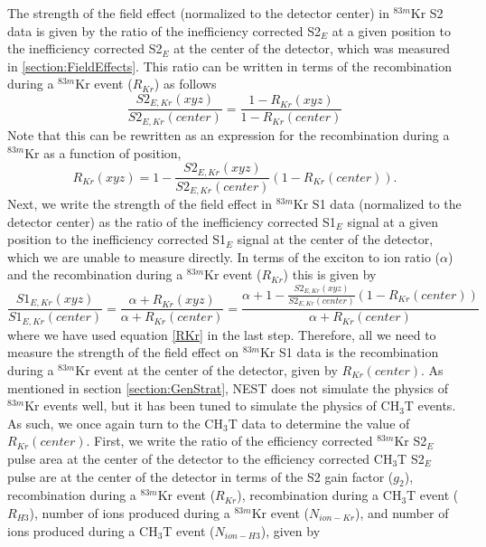 The strength of the field effect (normalized to the detector center) in $^{83m}$Kr S2 data is given by the ratio of the inefficiency corrected S2$_E$ at a given position to the inefficiency corrected S2$_E$ at the center of the detector, which was measured in \ref{section:FieldEffects}.  This ratio can be written in terms of the recombination during a $^{83m}$Kr event ($R_{Kr}$) as follows
\begin{equation}
\frac{S2_{E,Kr}(xyz)}{S2_{E,Kr}(center)} = \frac{1-R_{Kr}(xyz)}{1-R_{Kr}(center)}
\end{equation}
Note that this can be rewritten as an expression for the recombination during a $^{83m}$Kr as a function of position,
\begin{equation} \label{RKr}
R_{Kr}(xyz) = 1- \frac{S2_{E,Kr}(xyz)}{S2_{E,Kr}(center)}(1-R_{Kr}(center)).
\end{equation}
Next, we write the strength of the field effect in $^{83m}$Kr S1 data (normalized to the detector center) as the ratio of the inefficiency corrected S1$_E$ signal at a given position to the inefficiency corrected S1$_E$ signal at the center of the detector, which we are unable to measure directly.  In terms of the exciton to ion ratio ($\alpha$) and the recombination during a $^{83m}$Kr event ($R_{Kr}$) this is given by 
\begin{equation} \label{S1fieldstrength}
\frac{S1_{E,Kr}(xyz)}{S1_{E,Kr}(center)}=\frac{\alpha+R_{Kr}(xyz)}{\alpha+R_{Kr}(center)} = \frac{\alpha + 1 - \frac{S2_{E,Kr}(xyz)}{S2_{E,Kr}(center)}(1-R_{Kr}(center))}{\alpha + R_{Kr}(center)}
\end{equation}
where we have used equation \ref{RKr} in the last step.  Therefore, all we need to measure the strength of the field effect on $^{83m}$Kr S1 data is the recombination during a $^{83m}$Kr event at the center of the detector, given by $R_{Kr}(center)$.  As mentioned in section \ref{section:GenStrat}, NEST does not simulate the physics of $^{83m}$Kr events well, but it has been tuned to simulate the physics of CH$_3$T events.  As such, we once again turn to the CH$_3$T data to determine the value of $R_{Kr}(center)$.  First, we write the ratio of the efficiency corrected $^{83m}$Kr  S2$_E$ pulse area at the center of the detector to the efficiency corrected CH$_3$T S2$_E$ pulse are at the center of the detector in terms of the S2 gain factor ($g_2$), recombination during a $^{83m}$Kr event ($R_{Kr}$), recombination during a CH$_3$T event ($R_{H3}$), number of ions produced during a $^{83m}$Kr event ($N_{ion-Kr}$), and number of ions produced during a CH$_3$T event ($N_{ion-H3}$), given by

